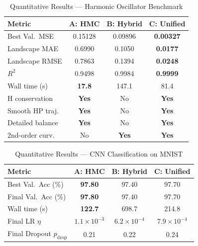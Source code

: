 \documentclass[11pt]{article}
\begin{document}
\begin{table}[H]
\centering
\caption{Quantitative Results --- Harmonic Oscillator Benchmark}
\label{tab:results}
\renewcommand{\arraystretch}{1.25}
\begin{tabular}{lccc}
\toprule
\textbf{Metric}     & \textbf{A: HMC} & \textbf{B: Hybrid} & \textbf{C: Unified} \\
\midrule
Best Val.\ MSE      & 0.15128 & 0.09896   & \textbf{0.00327} \\
Landscape MAE       & 0.6990  & 0.1050    & \textbf{0.0177}  \\
Landscape RMSE      & 0.7863  & 0.1394    & \textbf{0.0248}  \\
$R^2$               & 0.9498  & 0.9984    & \textbf{0.9999}  \\
Wall time (s)       & \textbf{17.8}   & 147.1   & 81.4    \\
H conservation      & \textbf{Yes}   & No      & \textbf{Yes}    \\
Smooth HP traj.\ & \textbf{Yes}   & No      & \textbf{Yes}    \\
Detailed balance    & \textbf{Yes}   & No      & \textbf{Yes}    \\
2nd-order curv.\    & No      & \textbf{Yes}    & \textbf{Yes}    \\
\bottomrule
\end{tabular}
\end{table}

\begin{table}[H]
\centering
\caption{Quantitative Results --- CNN Classification on MNIST}
\label{tab:cnn_results}
\renewcommand{\arraystretch}{1.25}
\begin{tabular}{lccc}
\toprule
\textbf{Metric}     & \textbf{A: HMC} & \textbf{B: Hybrid} & \textbf{C: Unified} \\
\midrule
Best Val.\ Acc (\%) & \textbf{97.80} & 97.40 & 97.70 \\
Final Val.\ Acc (\%) & \textbf{97.80} & 97.40 & 97.70 \\
Wall time (s)       & \textbf{122.7}  & 698.7  & 214.8  \\
Final LR $\eta$     & $1.1\!\times\!10^{-3}$
                    & $6.2\!\times\!10^{-4}$
                    & $7.9\!\times\!10^{-4}$ \\
Final Dropout $p_{\mathrm{drop}}$ & 0.21 & 0.22 & 0.24 \\
\bottomrule
\end{tabular}
\end{table}
\end{document}
